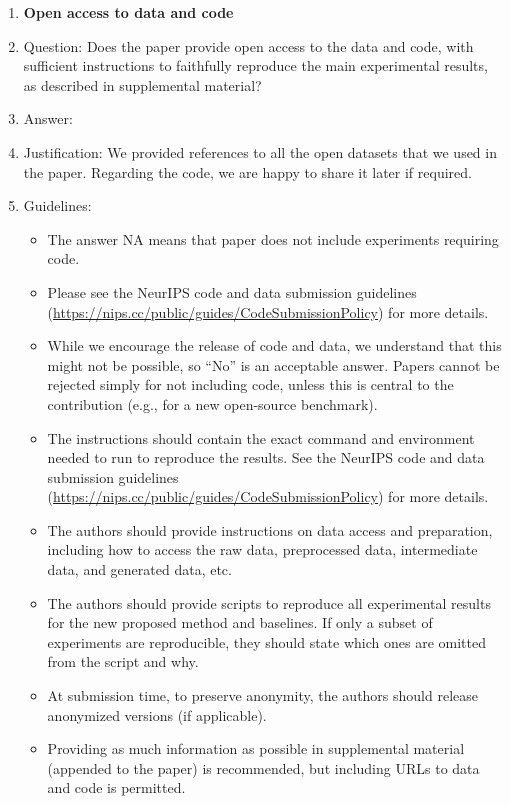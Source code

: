 \documentclass{article}
\begin{document}
\begin{enumerate}
\item {\bf Open access to data and code}
    \item[] Question: Does the paper provide open access to the data and code, with sufficient instructions to faithfully reproduce the main experimental results, as described in supplemental material?
    \item[] Answer: \answerNo{} %
    \item[] Justification: We provided references to all the open datasets that we used in the paper. Regarding the code, we are happy to share it later if required.
    \item[] Guidelines:
    \begin{itemize}
        \item The answer NA means that paper does not include experiments requiring code.
        \item Please see the NeurIPS code and data submission guidelines (\url{https://nips.cc/public/guides/CodeSubmissionPolicy}) for more details.
        \item While we encourage the release of code and data, we understand that this might not be possible, so “No” is an acceptable answer. Papers cannot be rejected simply for not including code, unless this is central to the contribution (e.g., for a new open-source benchmark).
        \item The instructions should contain the exact command and environment needed to run to reproduce the results. See the NeurIPS code and data submission guidelines (\url{https://nips.cc/public/guides/CodeSubmissionPolicy}) for more details.
        \item The authors should provide instructions on data access and preparation, including how to access the raw data, preprocessed data, intermediate data, and generated data, etc.
        \item The authors should provide scripts to reproduce all experimental results for the new proposed method and baselines. If only a subset of experiments are reproducible, they should state which ones are omitted from the script and why.
        \item At submission time, to preserve anonymity, the authors should release anonymized versions (if applicable).
        \item Providing as much information as possible in supplemental material (appended to the paper) is recommended, but including URLs to data and code is permitted.
    \end{itemize}



\end{enumerate}
\end{document}
